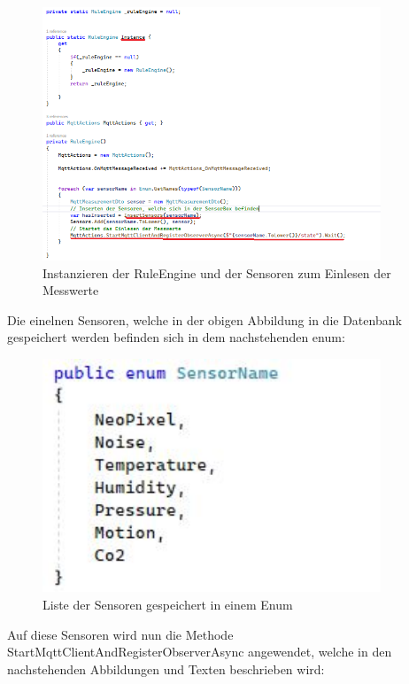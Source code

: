 \begin{figure}[H]
    \centering
    \includegraphics[width=0.9\textwidth]{pics/InstanzierenDerRuleEngineUndAufrufenDerMQTTMesswerte.png}
    \caption{Instanzieren der RuleEngine und der Sensoren zum Einlesen der Messwerte}
\end{figure}

Die einelnen Sensoren, welche in der obigen Abbildung in die Datenbank gespeichert werden
befinden sich in dem nachstehenden enum:

\begin{figure}[H]
    \centering
    \includegraphics[width=0.9\textwidth]{pics/SensorEnum.JPG}
    \caption{Liste der Sensoren gespeichert in einem Enum}
\end{figure}

Auf diese Sensoren wird nun die Methode StartMqttClientAndRegisterObserverAsync angewendet,
welche in den nachstehenden Abbildungen und Texten beschrieben wird:

